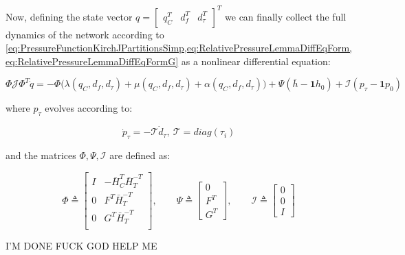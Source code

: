 Now, defining the state vector $q = \begin{bmatrix}q_C^T & d_f^T & d_{\tau}^T \end{bmatrix}^T$ we can finally collect the full dynamics of the network according to \cref{eq:PressureFunctionKirchJPartitionsSimp,eq:RelativePressureLemmaDiffEqForm,eq:RelativePressureLemmaDiffEqFormG} as a nonlinear differential equation:

\begin{equation}\label{eq:NonLinearModelWithTank}
	\Phi\mathcal{J}\Phi^T \dot{q} = -\Phi\Big(\lambda(q_C,d_f,d_{\tau})+\mu(q_C,d_f,d_{\tau})+\alpha(q_C,d_f,d_{\tau})\Big) + \Psi(\bar{h}-\mathbf{1}h_0) + \mathcal{I}(p_{\tau}-\mathbf{1}p_0)
\end{equation}

where $p_{\tau}$ evolves according to:

\begin{equation}\label{eq:TankDynamics}
	\dot{p}_{\tau} = - \mathcal{T} \dot{d}_{\tau}, \ \mathcal{T} = diag(\tau_i)
\end{equation}

and the matrices $\Phi, \Psi, \mathcal{I}$ are defined as:

\begin{equation}\label{eq:NonLinearModelMatrices}
	\Phi \triangleq 
	\begin{bmatrix} 
		I & -\bar{H}_C^T\bar{H}_T^{-T} \\ 0 & F^T\bar{H}_T^{-T} \\ 0  & G^T\bar{H}_T^{-T} \\ 
	\end{bmatrix}
	, \qquad
	\Psi \triangleq
	\begin{bmatrix}
		0 \\ F^T \\ G^T
	\end{bmatrix}
	, \qquad
	\mathcal{I} \triangleq
	\begin{bmatrix}
		0 \\ 0 \\ I
	\end{bmatrix}
\end{equation}



I'M DONE FUCK GOD HELP ME